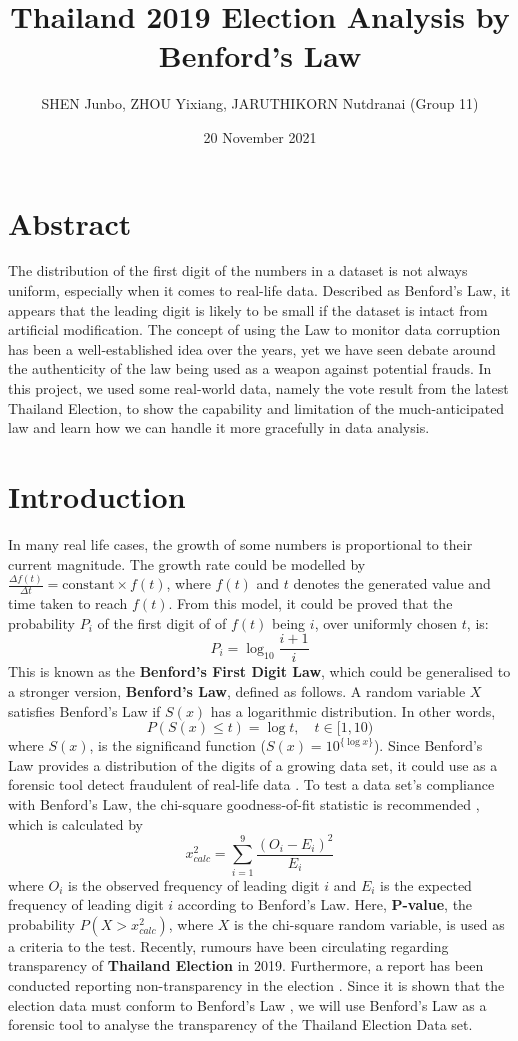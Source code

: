 \documentclass[12pt]{article}
\title{Thailand 2019 Election Analysis by Benford's Law}
\author{SHEN Junbo, ZHOU Yixiang, JARUTHIKORN Nutdranai (Group 11)}
\date{20 November 2021}
\begin{document}
\maketitle
\section{Abstract}

The distribution of the first digit of the numbers in a dataset is not always uniform, especially when it comes to real-life data. Described as Benford's Law, it appears that the leading digit is likely to be small if the dataset is intact from artificial modification. The concept of using the Law to monitor data corruption has been a well-established idea over the years, yet we have seen debate around the authenticity of the law being used as a weapon against potential frauds. In this project, we used some real-world data, namely the vote result from the latest Thailand Election, to show the capability and limitation of the much-anticipated law and learn how we can handle it more gracefully in data analysis.

\section{Introduction}

In many real life cases, the growth of some numbers is proportional to their current magnitude. The growth rate could be modelled by $\frac{\Delta f(t)}{\Delta t} = \text{constant}\times f(t)$, where $f(t)$ and $t$ denotes the generated value and time taken to reach $f(t)$. From this model, it could be proved \cite{yixiang} that the probability $P_i$ of the first digit of of $f(t)$ being $i$, over uniformly chosen $t$, is:
$$P_i = \log_{10}\frac{i+1}{i}$$
This is known as the \textbf{Benford's First Digit Law}, which could be generalised to a stronger version, \textbf{Benford's Law}, defined as follows. A random variable $X$ satisfies Benford's Law if $S(x)$ has a logarithmic distribution. In other words,
$$P(S(x) \leq t) = \log t, \quad t \in [1,10)$$where $S(x)$, is the significand function ($S(x) = 10^{ \{\log x\} }$). Since Benford's Law provides a distribution of the digits of a growing data set, it could use as a forensic tool detect fraudulent of real-life data \cite{walter}. To test a data set's compliance with Benford's Law, the chi-square goodness-of-fit statistic is recommended \cite{pike}, which is calculated by $$x_{calc}^2 = \sum_{i=1}^{9}\frac{(O_i - E_i)^2}{E_i}$$ where $O_i$ is the observed frequency of leading digit $i$ and $E_i$ is the expected frequency of leading digit $i$ according to Benford's Law. Here, \textbf{P-value}, the probability $P(X>x_{calc}^2)$, where $X$ is the chi-square random variable, is used as a criteria to the test. \newline \newline Recently, rumours have been circulating regarding transparency of \textbf{Thailand Election} in 2019. Furthermore, a report has been conducted reporting non-transparency in the election \cite{forsea}. Since it is shown that the election data must conform to Benford's Law \cite{walter}, we will use Benford's Law as a forensic tool to analyse the transparency of the Thailand Election Data set.
\end{document}
